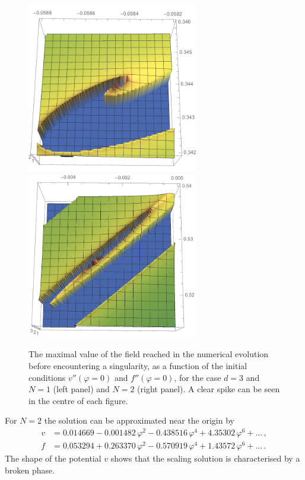 \documentclass[11pt]{book} %
\begin{document}
\begin{figure}
\includegraphics[width=7.5cm]{spike_d3N1.pdf}
\
\includegraphics[width=7.5cm]{spike_d3N2.pdf}
\caption{The maximal value of the field reached in the numerical
evolution before encountering a singularity, as a function
of the initial conditions $v''(\varphi=0)$ and $f''(\varphi=0)$,
for the case $d=3$ and $N=1$ (left panel) and $N=2$ (right panel).
A clear spike can be seen in the centre of each figure.
}
\label{WFN1N2}
\end{figure}

For $N=2$ the solution can be approximated near the origin by
\begin{align}
  v &= 0.014669 - 0.001482 \, \varphi ^2 - 0.438516 \, \varphi ^4 + 4.35302 \, \varphi ^6 + \dots \,, \nonumber \\
  f &= 0.053294 + 0.263370 \, \varphi ^2 - 0.570919 \, \varphi ^4 + 1.43572 \, \varphi ^6 + \dots \,. \nonumber
\end{align}
The shape of the potential $v$ shows that the scaling solution is characterised by a broken phase.
\end{document}
